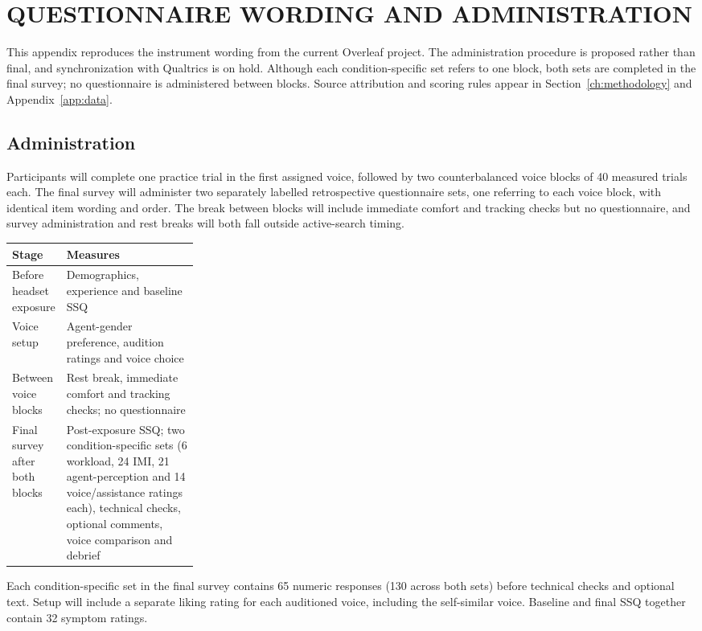 \chapter{QUESTIONNAIRE WORDING AND ADMINISTRATION}\label{app:instruments}
\newpage
This appendix reproduces the instrument wording from the current Overleaf project. The administration procedure is proposed rather than final, and synchronization with Qualtrics is on hold. Although each condition-specific set refers to one block, both sets are completed in the final survey; no questionnaire is administered between blocks. Source attribution and scoring rules appear in Section~\ref{ch:methodology} and Appendix~\ref{app:data}.



\section{Administration}
Participants will complete one practice trial in the first assigned voice, followed by two counterbalanced voice blocks of 40 measured trials each. The final survey will administer two separately labelled retrospective questionnaire sets, one referring to each voice block, with identical item wording and order. The break between blocks will include immediate comfort and tracking checks but no questionnaire, and survey administration and rest breaks will both fall outside active-search timing.

\begin{tabularx}{\linewidth}{@{}p{0.27\linewidth}X@{}}\toprule
Stage & Measures \\\midrule
Before headset exposure & Demographics, experience and baseline SSQ \\
Voice setup & Agent-gender preference, audition ratings and voice choice \\
Between voice blocks & Rest break, immediate comfort and tracking checks; no questionnaire \\
Final survey after both blocks & Post-exposure SSQ; two condition-specific sets (6 workload, 24 IMI, 21 agent-perception and 14 voice/assistance ratings each), technical checks, optional comments, voice comparison and debrief \\\bottomrule
\end{tabularx}
Each condition-specific set in the final survey contains 65 numeric responses (130 across both sets) before technical checks and optional text. Setup will include a separate liking rating for each auditioned voice, including the self-similar voice. Baseline and final SSQ together contain 32 symptom ratings.

